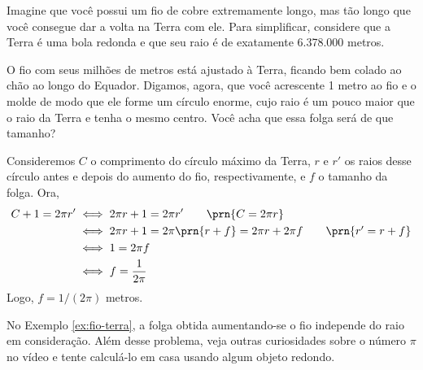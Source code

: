 \begin{example}
\label{ex:fio-terra}
Imagine que você possui um fio de cobre extremamente longo, mas tão longo que você consegue dar a volta na Terra com ele. Para simplificar, considere que a Terra é uma bola redonda e que seu raio é de exatamente 6.378.000 metros.

O fio com seus milhões de metros está ajustado à Terra, ficando bem colado ao chão ao longo do Equador. Digamos, agora, que você acrescente 1 metro ao fio e o molde de modo que ele forme um círculo enorme, cujo raio é um pouco maior que o raio da Terra e tenha o mesmo centro. Você acha que essa folga será de que tamanho?
\end{example}

\begin{solution}
Consideremos $C$ o comprimento do círculo máximo da Terra, $r$ e $r'$ os raios desse círculo antes e depois do aumento do fio, respectivamente, e $f$ o tamanho da folga. Ora,
%
\begin{align*}
C+1=2\pi r' & \iff 2\pi r+1=2\pi r' \tag*{$\prn{C = 2\pi r}$}\\
	& \iff 2\pi r+1= 2\pi \prn{r+f} = 2\pi r+2\pi f \tag*{$\prn{r' = r+f}$}\\
	& \iff 1 = 2\pi f\\
	& \iff f = \dfrac{1}{2\pi}
\end{align*}
%
Logo, $f = 1/(2\pi)$ metros.
\end{solution}

\noindent No Exemplo \ref{ex:fio-terra}, a folga obtida aumentando-se o fio independe do raio em consideração. Além desse problema, veja outras curiosidades sobre o número $\pi$ no vídeo  e tente calculá-lo em casa usando algum objeto redondo.	